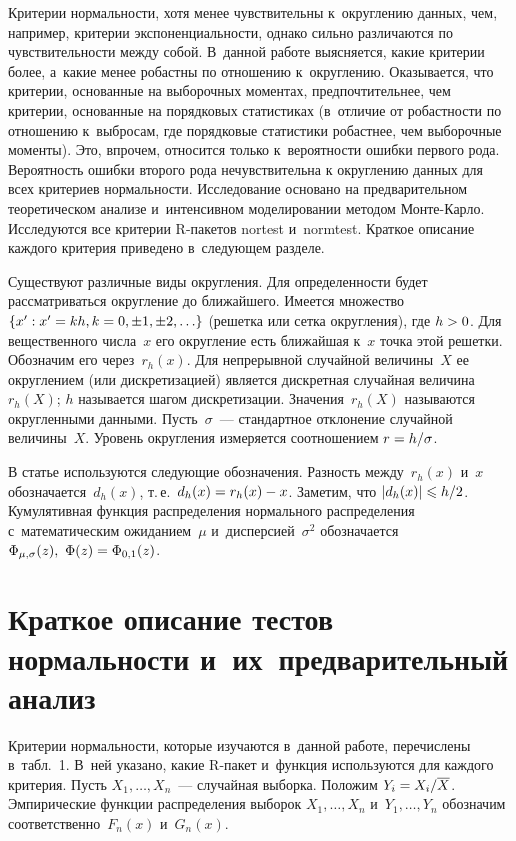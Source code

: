 \begin{multicols}{2}
Критерии нормальности, хотя менее чувствительны к~округлению данных, чем, например, критерии
экспоненциальности, однако сильно различаются по чувствительности между собой. В~данной работе выясняется,
какие критерии более, а~какие менее робастны по отношению к~округлению. Оказывается, что критерии, основанные
на выборочных моментах, предпочтительнее, чем критерии, основанные на порядковых статистиках (в~отличие от
робастности по отношению к~выбросам, где порядковые статистики робастнее, чем выборочные моменты).
Это, впрочем, относится только к~вероятности ошибки первого рода. Вероятность ошибки второго рода нечувствительна
к округлению данных для всех критериев нормальности. Исследование основано на предварительном теоретическом
анализе и~интенсивном моделировании методом Мон\-те-Кар\-ло. Исследуются все критерии R-па\-ке\-тов nortest и~normtest.
Краткое описание каждого критерия приведено в~следующем разделе.

Существуют различные виды округления. Для определенности будет рассматриваться округление до ближайшего.
Имеется множество $\{x': x'\hm=kh, k\hm=0,\pm1,\pm2,\ldots\}$ (решетка или сетка округления), где $h\hm>0$. Для
вещественного числа~$x$ его округление есть ближайшая к~$x$ точка этой решетки. Обозначим его через~$r_h(x)$.
Для непрерывной случайной величины~$X$ ее округлением (или дискретизацией) является дискретная случайная
величина~$r_h(X)$; $h$ называется шагом дискретизации. Значения~$r_h(X)$ называются округленными данными.
Пусть~$\sigma$~--- стандартное отклонение
случайной величины~$X$. Уровень округления измеряется соотношением $r\hm=h/\sigma$.

В статье  используются следующие обозначения. Разность между~$r_h(x)$ и~$x$ обозначается~$d_h(x)$, 
т.\,е.\ $d_h(x)\hm=r_h(x)\hm-x$. Заметим, что $|d_h(x)|\hm\leqslant h/2$. Кумулятивная функция
распределения нормального распределения с~математическим ожиданием~$\mu$ и~дисперсией~$\sigma^2$
обозначается $\Phi_{\mu,\sigma}(z),\ \Phi(z)\hm=\Phi_{0,1}(z)$.


\vspace*{-9pt}


\section{Краткое описание тестов нормальности и~их~предварительный анализ}

\vspace*{-2pt}

Критерии нормальности, которые изучаются в~данной работе, перечислены в~табл.~1.
В~ней указано, какие R-па\-кет и~функция используются для каж\-до\-го критерия. Пусть $X_1,\ldots,X_n$~---
случайная выборка. Положим $Y_i\hm=X_i/\overline X$. Эмпирические функции распределения выборок
$X_1,\ldots ,X_n$ и~$Y_1,\ldots ,Y_n$ обозначим соответственно~$F_n(x)$ и~$G_n(x)$.


\end{multicols}
